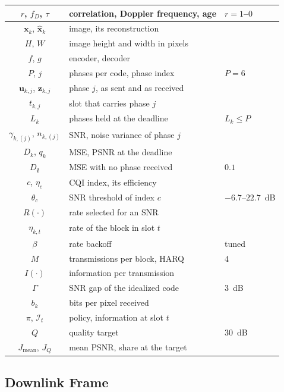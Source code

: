 \begin{table}[!t]
\begin{tabular}{|c|>{\raggedright\arraybackslash}p{4.45cm}|>{\raggedright\arraybackslash}p{1.75cm}|}
$r$, $f_D$, $\tau$ & correlation, Doppler frequency, age & $r = 1$--$0$ \\
\hline
$\mathbf{x}_k$, $\hat{\mathbf{x}}_k$ & image, its reconstruction & \\
$H$, $W$ & image height and width in pixels & \\
$f$, $g$ & encoder, decoder & \\
$P$, $j$ & phases per code, phase index & $P = 6$ \\
$\mathbf{u}_{k,j}$, $\mathbf{z}_{k,j}$ & phase $j$, as sent and as received & \\
$t_{k,j}$ & slot that carries phase $j$ & \\
$L_k$ & phases held at the deadline & $L_k \le P$ \\
$\gamma_{k,(j)}$, $n_{k,(j)}$ & SNR, noise variance of phase $j$ & \\
$D_k$, $q_k$ & MSE, PSNR at the deadline & \\
$D_\emptyset$ & MSE with no phase received & $0.1$ \\
\hline
$c$, $\eta_c$ & CQI index, its efficiency & \cite{TS36213} \\
$\theta_c$ & SNR threshold of index $c$ & $-6.7$--$22.7$~dB \\
$R(\cdot)$ & rate selected for an SNR & \\
$\eta_{k,t}$ & rate of the block in slot $t$ & \\
$\beta$ & rate backoff & tuned \\
$M$ & transmissions per block, HARQ & $4$ \\
$I(\cdot)$ & information per transmission & \\
$\Gamma$ & SNR gap of the idealized code & $3$~dB \\
$b_k$ & bits per pixel received & \\
\hline
$\pi$, $\mathcal{I}_t$ & policy, information at slot $t$ & \\
$Q$ & quality target & $30$~dB \\
$J_{\mathrm{mean}}$, $J_Q$ & mean PSNR, share at the target & \\
\hline
\end{tabular}
\end{table}

\subsection{Downlink Frame}
\label{sec:system-frame}

